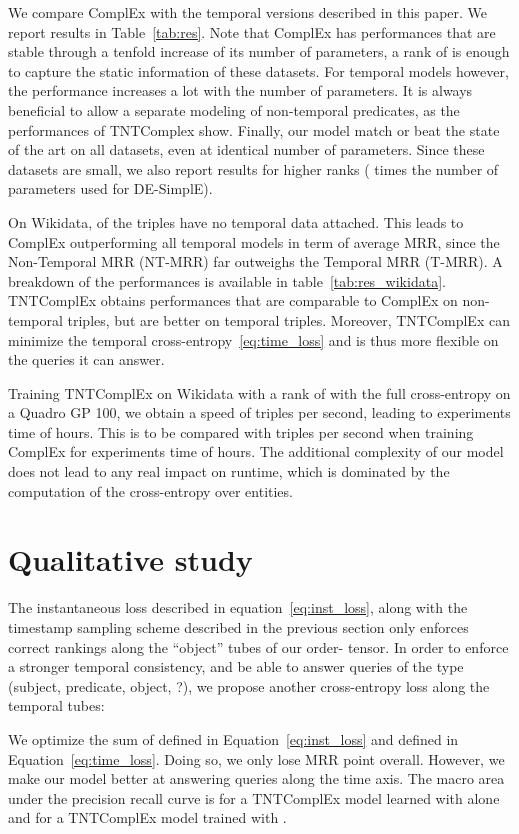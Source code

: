 \documentclass{article}
\begin{document}
We compare ComplEx with the temporal versions described in this paper. We report results in Table~\ref{tab:res}. Note that ComplEx has performances that are stable through a tenfold increase of its number of parameters, a rank of  is enough to capture the static information of these datasets. For temporal models however, the performance increases a lot with the number of parameters. It is always beneficial to allow a separate modeling of non-temporal predicates, as the performances of TNTComplex show. Finally, our model match or beat the state of the art on all datasets, even at identical number of parameters. Since these datasets are small, we also report results for higher ranks ( times the number of parameters used for DE-SimplE).

On Wikidata,  of the triples have no temporal data attached. This leads to ComplEx outperforming all temporal models in term of average MRR, since the Non-Temporal MRR (NT-MRR) far outweighs the Temporal MRR (T-MRR). A breakdown of the performances is available in table~\ref{tab:res_wikidata}. 
TNTComplEx obtains performances that are comparable to ComplEx on non-temporal triples, but are better on temporal triples. Moreover, TNTComplEx can minimize the temporal cross-entropy~\eqref{eq:time_loss} and is thus more flexible on the queries it can answer.

Training TNTComplEx on Wikidata with a rank of  with the full cross-entropy on a Quadro GP 100, we obtain a speed of  triples per second, leading to experiments time of  hours. This is to be compared with  triples per second when training ComplEx for experiments time of  hours. The additional complexity of our model does not lead to any real impact on runtime, which is dominated by the computation of the cross-entropy over  entities.



\section{Qualitative study}
\label{sec:auxiliary}
The instantaneous loss described in equation~\eqref{eq:inst_loss}, along with the timestamp sampling scheme described in the previous section only enforces correct rankings along the ``object'' tubes of our order- tensor. In order to enforce a stronger temporal consistency, and be able to answer queries of the type (subject, predicate, object, ?), we propose another cross-entropy loss along the temporal tubes:

We optimize the sum of  defined in Equation~\ref{eq:inst_loss} and  defined in Equation~\ref{eq:time_loss}. Doing so, we only lose  MRR point overall. However, we make our model better at answering queries along the time axis. The macro area under the precision recall curve is  for a TNTComplEx model learned with  alone and  for a TNTComplEx model trained with .
\end{document}
